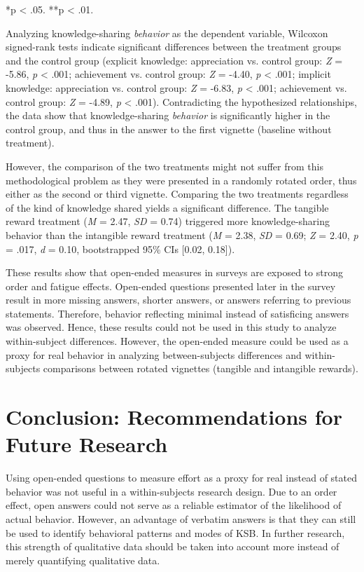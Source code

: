\documentclass[twocolumn, serif, empirical, authordate]{jote-article}
\begin{document}
*p \textless{} .05. **p \textless{} .01.

Analyzing knowledge-sharing \emph{behavior} as the dependent variable, Wilcoxon signed-rank tests indicate significant differences between the treatment groups and the control group (explicit knowledge: appreciation vs. control group: \emph{Z} = -5.86, \emph{p} \textless{} .001; achievement vs. control group: \emph{Z} = -4.40, \emph{p} \textless{} .001; implicit knowledge: appreciation vs. control group: \emph{Z} = -6.83, \emph{p} \textless{} .001; achievement vs. control group: \emph{Z} = -4.89, \emph{p} \textless{} .001). Contradicting the hypothesized relationships, the data show that knowledge-sharing \emph{behavior} is significantly higher in the control group, and thus in the answer to the first vignette (baseline without treatment).

However, the comparison of the two treatments might not suffer from this methodological problem as they were presented in a randomly rotated order, thus either as the second or third vignette. Comparing the two treatments regardless of the kind of knowledge shared yields a significant difference. The tangible reward treatment (\emph{M} = 2.47, \emph{SD} = 0.74) triggered more knowledge-sharing behavior than the intangible reward treatment (\emph{M} = 2.38, \emph{SD} = 0.69; \emph{Z} = 2.40, \emph{p} = .017, \emph{d} = 0.10, bootstrapped 95\% CIs {[}0.02, 0.18{]}).

These results show that open-ended measures in surveys are exposed to strong order and fatigue effects. Open-ended questions presented later in the survey result in more missing answers, shorter answers, or answers referring to previous statements. Therefore, behavior reflecting minimal instead of satisficing answers was observed. Hence, these results could not be used in this study to analyze within-subject differences. However, the open-ended measure could be used as a proxy for real behavior in analyzing between-subjects differences and within-subjects comparisons between rotated vignettes (tangible and intangible rewards).


\section*{Conclusion: Recommendations for Future Research}
\label{sec:Conclusion: Recommendations for Future Research}

Using open-ended questions to measure effort as a proxy for real instead of stated behavior was not useful in a within-subjects research design.
Due to an order effect, open answers could not serve as a reliable estimator of the likelihood of actual behavior. However, an advantage of verbatim answers is that they can still be used to identify behavioral patterns and modes of KSB. In further research, this strength of qualitative data should be taken into account more instead of merely quantifying qualitative data.
\end{document}

